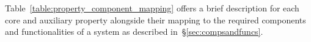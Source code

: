 \documentclass{sig-alternate}
\begin{document}



Table~\ref{table:property_component_mapping} offers a brief description for each
core and auxiliary property alongside their mapping to the required components
and functionalities of a \pilot system as described
in~\S\ref{sec:compsandfuncs}.


\end{document}
